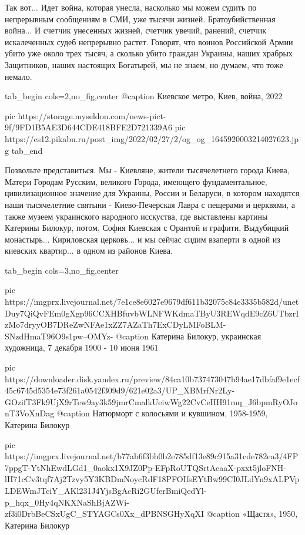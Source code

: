 Так вот... Идет война, которая унесла, насколько мы можем судить по непрерывным
сообщениям в СМИ, уже тысячи жизней. Братоубийственная война... И счетчик
унесенных жизней, счетчик увечий, ранений, счетчик искалеченных судеб
непрерывно растет. Говорят, что воинов Российской Армии убито уже около трех
тысяч, а сколько убито граждан Украины, наших храбрых Защитников, наших
настоящих Богатырей, мы не знаем, но думаем, что тоже немало. 

\ifcmt
  tab_begin cols=2,no_fig,center
		 @caption Киевское метро, Киев, война, 2022

		 pic https://storage.myseldon.com/news-pict-9f/9FD1B5AE3D644CDE418BFE2D721339A6
     pic https://cs12.pikabu.ru/post_img/2022/02/27/2/og_og_1645920003214027623.jpg
  tab_end
\fi

Позвольте представиться. Мы - Киевляне, жители тысячелетнего города Киева,
Матери Городам Русским, великого Города, имеющего фундаментальное,
цивилизационное значение для Украины, России и Беларуси, в котором находятся
наши тысячелетние святыни - Киево-Печерская Лавра с пещерами и церквями, а
также музеем украинского народного исскуства, где выставлены картины Катерины
Билокур, потом, София Киевская с Орантой и графити, Выдубицкий монастырь...
Кириловская церковь... и мы сейчас сидим взаперти в одной из киевских
квартир... в одном из районов Киева. 

\ifcmt
  tab_begin cols=3,no_fig,center

     pic https://imgprx.livejournal.net/7e1ce8e6027e9679df611b32075c84e3335b582d/unetDuy7QiQvFEm0gXgp96CCXHBfuvbWLNFWKdmaTByU3REWqdE9cZ6UTbzrIzMo7dryyOB7DReZwNFAe1xZZ7AZaTh7ExCDyLMFoBLM-SNzdHmaT96O9s1pw--OMYz-
		 @caption Катерина Билокур, украинская художница, 7 декабря 1900 - 10 июня 1961 

		 pic https://downloader.disk.yandex.ru/preview/84ca10b737473047b94ae17dbfaf9e1ecf45c6745d5354e73f261a0542f309d9/621e02a3/UP_XBMrfNr2Ly-GOzifT3Fk9UjX9rTew9ay3k59jmrCmalkUeiwWg22CvCeHH91mq_J6bpmRyOJonT3VoXnDag%
		 @caption Натюрморт с колосьями и кувшином, 1958-1959, Катерина Билокур

		 pic https://imgprx.livejournal.net/b77ab6f3bb0b2e785df13e89c915a31cde782ea3/4FP7ppgT-YtNhEwdLGd1_0aokx1X9JZ0Pp-EFpRoUTQSrtAeaaX-pxxt5jloFNH-lH71cCv3tqf7Aj2Tzvy5Y3KBDmNoycRdF18PFOIfsEYtBw99CI0JLdYn9xALPVpLDEWmJTciY_AKl231J4YjsBgAcRi2GUferBmiQedYl-p_hqx_0Hy4qNKXNaShBjAZWi-zf3i0DrbBeCSxUgC_STYAGCs0Xx_dPBNSGHyXqXI
		 @caption «Щастя», 1950, Катерина Билокур

